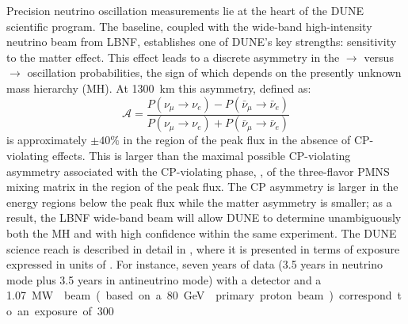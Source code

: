 Precision neutrino oscillation measurements lie at the heart of the DUNE scientific program.
The  baseline, coupled with the wide-band
high-intensity neutrino beam from LBNF, establishes one of DUNE's key
strengths: sensitivity to the matter effect. This effect leads to a
discrete asymmetry in the \numu $\to$ \nue versus \anumu $\to$ \anue
oscillation probabilities, the sign of which depends on the presently
unknown mass hierarchy (MH).  At \SI{1300}{\km} this asymmetry, defined as:
\begin{equation}
\mathcal{A} = \frac{ P(\nu_\mu \rightarrow \nu_e)-P(\bar{\nu}_\mu \rightarrow \bar{\nu}_e)}{P(\nu_\mu \rightarrow \nu_e)+P(\bar{\nu}_\mu \rightarrow \bar{\nu}_e)}
\end{equation}
is approximately $\pm 40\%$ in the region of the peak flux in the
absence of CP-violating effects. This is larger than the maximal
possible CP-violating asymmetry associated with the CP-violating
phase, \deltacp, of the three-flavor PMNS mixing matrix in the region of
the peak flux. The CP asymmetry is larger in the energy regions below the peak
flux while the matter asymmetry is smaller; as a result, the LBNF
wide-band beam will allow DUNE to determine unambiguously both the MH and
\deltacp with high confidence within the same experiment. 
The DUNE science reach is described in detail in \volphys, where it is presented 
in terms of  exposure expressed in units of \ktMWyr{}.
For instance, seven years of data
(\num{3.5} years in neutrino mode plus \num{3.5} years in antineutrino
mode) with a  detector and a \SI{1.07}\MW{} beam (based on a \SI{80}\GeV{} primary proton beam) correspond to an
exposure of \SI{300}\ktMWyr{}. 

